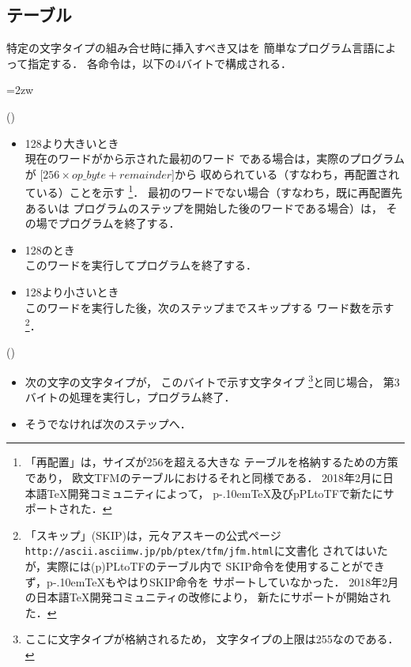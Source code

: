 \documentclass[a4paper,11pt,nomag]{jsarticle}
\def\size#1{\mathit{#1}}
\def\pTeX{p\kern-.10em\TeX}\def\upTeX{u\pTeX}
\begin{document}
\subsection{テーブル}
特定の文字タイプの組み合せ時に挿入すべき又はを
簡単なプログラム言語によって指定する．
各命令は，以下の4バイトで構成される．
\begin{description}\itemindent=2zw
\item[第1バイト] ()
  \begin{itemize}
  \item 128より大きいとき\\
    現在のワードがから示された最初のワード
    である場合は，実際のプログラムが
    [$256\times\size{op\_byte}+\size{remainder}$]から
    収められている（すなわち，再配置されている）ことを示す
    \footnote{「再配置」は，サイズが256を超える大きな
    テーブルを格納するための方策であり，
    欧文TFMのテーブルにおけるそれと同様である．
    2018年2月に日本語\TeX{}開発コミュニティによって，
    \pTeX{}及びpPLtoTFで新たにサポートされた．}．
    最初のワードでない場合（すなわち，既に再配置先あるいは
    プログラムのステップを開始した後のワードである場合）は，
    その場でプログラムを終了する．
  \item 128のとき\\
    このワードを実行してプログラムを終了する．
  \item 128より小さいとき\\
    このワードを実行した後，次のステップまでスキップする
    ワード数を示す
    \footnote{「スキップ」(SKIP)は，元々アスキーの公式ページ
    \texttt{http://ascii.asciimw.jp/pb/ptex/tfm/jfm.html}に文書化
    されてはいたが，実際には(p)PLtoTFのテーブル内で
    SKIP命令を使用することができず，\pTeX{}もやはりSKIP命令を
    サポートしていなかった．
    2018年2月の日本語\TeX{}開発コミュニティの改修により，
    新たにサポートが開始された．}．
  \end{itemize}
\item[第2バイト] ()
  \begin{itemize}
  \item 次の文字の文字タイプが，
    このバイトで示す文字タイプ
    \footnote{ここに文字タイプが格納されるため，
    文字タイプの上限は255なのである．}と同じ場合，
    第3バイトの処理を実行し，プログラム終了．
  \item そうでなければ次のステップへ．
  \end{itemize}

\end{description}
\end{document}
